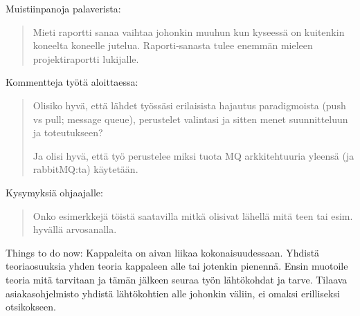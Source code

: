 Muistiinpanoja palaverista:
\begin{quote}
Mieti raportti sanaa vaihtaa johonkin muuhun kun kyseessä on kuitenkin koneelta koneelle jutelua. Raporti-sanasta tulee enemmän mieleen projektiraportti lukijalle.
\end{quote}

Kommentteja työtä aloittaessa:
\begin{quote}
	Olisiko hyvä, että lähdet työssäsi erilaisista hajautus paradigmoista (push vs pull; message queue), perustelet valintasi ja sitten menet suunnitteluun ja toteutukseen?
	
	Ja olisi hyvä, että työ perustelee miksi tuota MQ arkkitehtuuria yleensä (ja rabbitMQ:ta) käytetään.
\end{quote}

Kysymyksiä ohjaajalle:
\begin{quote}
	Onko esimerkkejä töistä saatavilla mitkä olisivat lähellä mitä teen tai esim. hyvällä arvosanalla.
\end{quote}

Things to do now:
Kappaleita on aivan liikaa kokonaisuudessaan. Yhdistä teoriaosuuksia yhden teoria kappaleen alle tai jotenkin pienennä. Ensin muotoile teoria mitä tarvitaan ja tämän jälkeen seuraa työn lähtökohdat ja tarve. Tilaava asiakasohjelmisto yhdistä lähtökohtien alle johonkin väliin, ei omaksi erilliseksi otsikokseen.